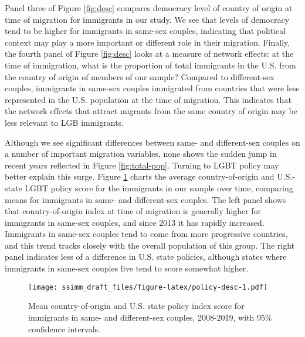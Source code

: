 \documentclass[
  11pt,
]{article}
\begin{document}
Panel three of Figure \ref{fig:desc} compares democracy level of country of origin at time of migration for immigrants in our study. We see that levels of democracy tend to be higher for immigrants in same-sex couples, indicating that political context may play a more important or different role in their migration. Finally, the fourth panel of Figure \ref{fig:desc} looks at a measure of network effects: at the time of immigration, what is the proportion of total immigrants in the U.S. from the country of origin of members of our sample? Compared to different-sex couples, immigrants in same-sex couples immigrated from countries that were less represented in the U.S. population at the time of migration. This indicates that the network effects that attract migrants from the same country of origin may be less relevant to LGB immigrants.

Although we see significant differences between same- and different-sex couples on a number of important migration variables, none shows the sudden jump in recent years reflected in Figure \ref{fig:total-pop}. Turning to LGBT policy may better explain this surge. Figure \ref{fig:policy-desc} charts the average country-of-origin and U.S.-state LGBT policy score for the immigrants in our sample over time, comparing means for immigrants in same- and different-sex couples. The left panel shows that country-of-origin index at time of migration is generally higher for immigrants in same-sex couples, and since 2013 it has rapidly increased. Immigrants in same-sex couples tend to come from more progressive countries, and this trend tracks closely with the overall population of this group. The right panel indicates less of a difference in U.S. state policies, although states where immigrants in same-sex couples live tend to score somewhat higher.

\begin{figure}
\centering
\texttt{[image: ssimm\_draft\_files/figure-latex/policy-desc-1.pdf]}
\caption{\label{fig:policy-desc}Mean country-of-origin and U.S. state policy index score for immigrants in same- and different-sex couples, 2008-2019, with 95\% confidence intervals.}
\end{figure}
\end{document}
